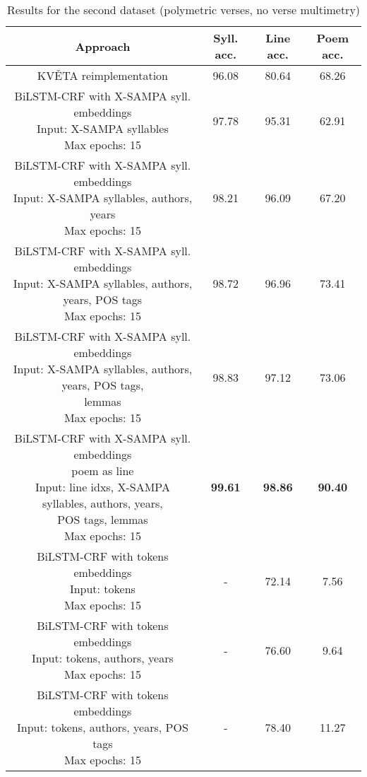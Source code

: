 \begin{table}[htpb]
\centering
\caption[Results for the second dataset]{Results for the second dataset (polymetric verses, no verse multimetry)}\label{tab:results-data-set-1}
\begin{tabular}{|c||c|c|c|}\hline
    Approach & Syll. acc. & Line acc. & Poem acc.\\\hline\hline
    KVĚTA reimplementation & 96.08 & 80.64 & 68.26\\\hline
    \makecell{BiLSTM-CRF with X-SAMPA syll. embeddings\\Input: X-SAMPA syllables\\Max epochs: 15} & 97.78 & 95.31 & 62.91\\\hline
    \makecell{BiLSTM-CRF with X-SAMPA syll. embeddings\\Input: X-SAMPA syllables, authors, years\\Max epochs: 15} & 98.21 & 96.09 & 67.20\\\hline
    \makecell{BiLSTM-CRF with X-SAMPA syll. embeddings\\Input: X-SAMPA syllables, authors, years, POS tags\\Max epochs: 15} & 98.72 & 96.96 & 73.41\\\hline
    \makecell{BiLSTM-CRF with X-SAMPA syll. embeddings\\Input: X-SAMPA syllables, authors, years, POS tags,\\lemmas\\Max epochs: 15} & 98.83 & 97.12 & 73.06\\\hline
    \makecell{BiLSTM-CRF with X-SAMPA syll. embeddings\\poem as line\\Input: line idxs, X-SAMPA syllables, authors, years,\\POS tags, lemmas\\Max epochs: 15} & \textbf{99.61} & \textbf{98.86} & \textbf{90.40}\\\hline
    \makecell{BiLSTM-CRF with tokens embeddings\\Input: tokens\\Max epochs: 15} & - & 72.14 & 7.56\\\hline
    \makecell{BiLSTM-CRF with tokens embeddings\\Input: tokens, authors, years\\Max epochs: 15} & - & 76.60 & 9.64\\\hline
    \makecell{BiLSTM-CRF with tokens embeddings\\Input: tokens, authors, years, POS tags\\Max epochs: 15} & - & 78.40 & 11.27\\\hline

\end{tabular}
\end{table}

